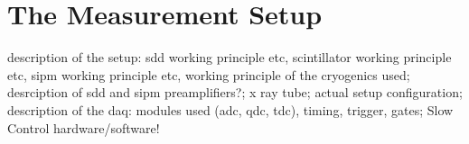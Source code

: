 \chapter{The Measurement Setup}
\label{chap:Setup}

description of the setup: sdd working principle etc, scintillator working principle etc, sipm working principle etc, working principle of the cryogenics used; desrciption of sdd and sipm preamplifiers?; x ray tube; actual setup configuration; description of the daq: modules used (adc, qdc, tdc), timing, trigger, gates; Slow Control hardware/software!